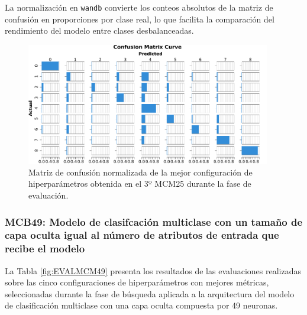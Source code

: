 La normalización en \texttt{wandb} convierte los conteos absolutos de la matriz de confusión en proporciones por clase real, lo que facilita la comparación del rendimiento del modelo entre clases desbalanceadas.

\begin{figure}[H]
    \centering
    \includegraphics[width=0.95\textwidth]{./img/evaluacion/matrices_confusion/MCNorm_EVAL_MCM25.pdf}
    \caption{Matriz de confusión normalizada de la mejor configuración de hiperparámetros obtenida en el 3º MCM25 durante la fase de evaluación.}
    \label{fig:MCNorm_EVAL_MCM25}
\end{figure}



\subsubsection{MCB49: Modelo de clasifcación multiclase con un tamaño de capa oculta igual al número de atributos de entrada que recibe el modelo}
La Tabla \ref{fig:EVALMCM49} presenta los resultados de las evaluaciones realizadas sobre las cinco configuraciones de hiperparámetros con mejores métricas, seleccionadas durante la fase de búsqueda aplicada a la arquitectura del modelo de clasificación multiclase con una capa oculta compuesta por 49 neuronas.


